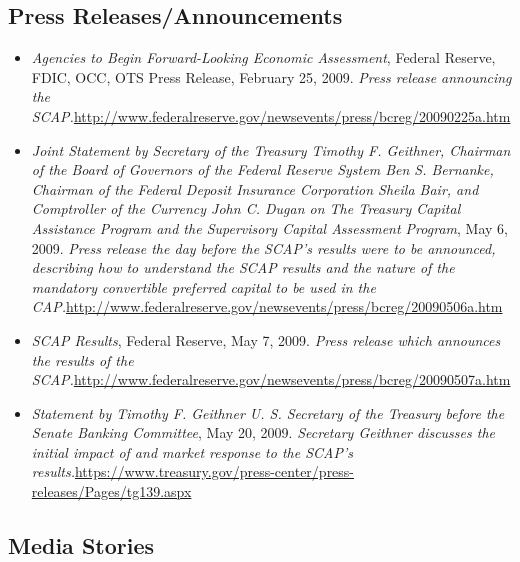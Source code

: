 \documentclass[12pt]{article}
\begin{document}
\subsection{Press Releases/Announcements}

\begin{itemize}
\item
\emph{Agencies
  to Begin Forward-Looking Economic Assessment}, Federal Reserve, FDIC,
  OCC, OTS Press Release, February 25, 2009. \emph{Press release
  announcing the SCAP.}\url{http://www.federalreserve.gov/newsevents/press/bcreg/20090225a.htm}
\item
\emph{Joint
  Statement by Secretary of the Treasury Timothy F. Geithner, Chairman
  of the Board of Governors of the Federal Reserve System Ben S.
  Bernanke, Chairman of the Federal Deposit Insurance Corporation Sheila
  Bair, and Comptroller of the Currency John C. Dugan on The Treasury
  Capital Assistance Program and the Supervisory Capital Assessment
  Program}, May 6, 2009. \emph{Press release the day before the SCAP's
  results were to be announced, describing how to understand the SCAP
  results and the nature of the mandatory convertible preferred capital
  to be used in the CAP.}\url{http://www.federalreserve.gov/newsevents/press/bcreg/20090506a.htm}
\item
\emph{SCAP
  Results}, Federal Reserve, May 7, 2009. \emph{Press release which
  announces the results of the SCAP.}\url{http://www.federalreserve.gov/newsevents/press/bcreg/20090507a.htm}
\item
\emph{Statement
  by Timothy F. Geithner U. S. Secretary of the Treasury before the
  Senate Banking Committee}, May 20, 2009. \emph{Secretary Geithner
  discusses the initial impact of and market response to the SCAP's
  results.}\url{https://www.treasury.gov/press-center/press-releases/Pages/tg139.aspx}
\end{itemize}

\subsection{Media Stories}
\end{document}
